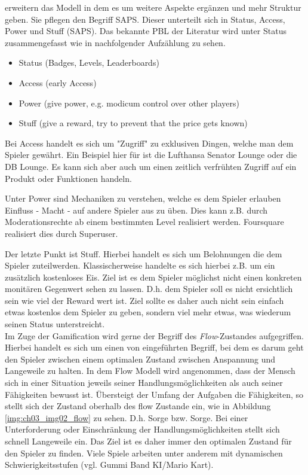 \cite{Zichermann.2011} erweitern das Modell in dem es um weitere Aspekte ergänzen und mehr Struktur geben.
Sie pflegen den Begriff SAPS. Dieser unterteilt sich in Status, Access, Power und Stuff (SAPS).
Das bekannte PBL der Literatur wird unter Status zusammengefasst wie in nachfolgender Aufzählung zu sehen.

\begin{itemize}
      \item Status (Badges, Levels, Leaderboards)
      \item Access (early Access)
      \item Power (give power, e.g. modicum control over other players)
      \item Stuff (give a reward, try to prevent that the price gets known)
\end{itemize}

Bei Access handelt es sich um "Zugriff" zu exklusiven Dingen, welche man dem Spieler gewährt. Ein Beispiel hier für ist die Lufthansa Senator Lounge oder die DB Lounge.
Es kann sich aber auch um einen zeitlich verfrühten Zugriff auf ein Produkt oder Funktionen handeln.

Unter Power sind Mechaniken zu verstehen, welche es dem Spieler erlauben Einfluss - Macht - auf andere Spieler aus zu üben. Dies kann z.B. durch Moderationsrechte ab einem bestimmten Level realisiert werden. Foursquare realisiert dies durch Superuser.

Der letzte Punkt ist Stuff. Hierbei handelt es sich um Belohnungen die dem Spieler zuteilwerden. Klassischerweise handelte es sich hierbei z.B. um ein zusätzlich kostenloses Eis. Ziel ist es dem Spieler möglichst nicht einen konkreten monitären Gegenwert sehen zu lassen. D.h. dem Spieler soll es nicht ersichtlich sein wie viel der Reward wert ist. Ziel sollte es daher auch nicht sein einfach etwas kostenlos dem Spieler zu geben, sondern viel mehr etwas, was wiederum seinen Status unterstreicht.\\

Im Zuge der Gamification wird gerne der Begriff des \textit{Flow}-Zustandes aufgegriffen.
Hierbei handelt es sich um einen von \cite{Csikszentmihalyi.1991} eingeführten Begriff, bei dem es darum geht den Spieler zwischen einem optimalen Zustand zwischen Anspannung und Langeweile zu halten. In dem Flow Modell wird angenommen, dass der Mensch sich in einer Situation jeweils seiner Handlungsmöglichkeiten als auch seiner Fähigkeiten bewusst ist.
Übersteigt der Umfang der Aufgaben die Fähigkeiten, so stellt sich der Zustand oberhalb des flow Zustande ein, wie in Abbildung \ref{img:ch03_img02_flow} zu sehen. D.h. Sorge bzw. Sorge. Bei einer Unterforderung oder Einschränkung der Handlungsmöglichkeiten stellt sich schnell Langeweile ein. Das Ziel ist es daher immer den optimalen Zustand für den Spieler zu finden. Viele Spiele arbeiten unter anderem mit dynamischen Schwierigkeitsstufen (vgl. Gummi Band KI/Mario Kart).

